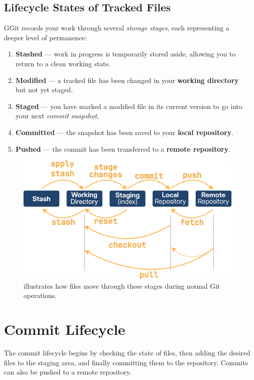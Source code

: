 \subsection{Lifecycle States of Tracked Files}
GGit records your work through several \textit{storage stages}, each representing a deeper level of permanence:
\begin{enumerate}
     \item \textbf{Stashed} --- work in progress is temporarily stored aside, allowing you to return to a clean working state.
    \item \textbf{Modified} --- a tracked file has been changed in your \textbf{working directory} but not yet staged.
    \item \textbf{Staged} --- you have marked a modified file in its current version to go into your next \textit{commit snapshot}.
    \item \textbf{Committed} ---  the snapshot has been saved to your \textbf{local repository}.
    \item \textbf{Pushed} --- the commit has been transferred to a \textbf{remote repository}.
\end{enumerate}

\begin{figure}[H]
\centering
    \includegraphics[scale=1]{Images/recordingChanges.png}
    \caption{illustrates how files move through these stages during normal Git operations.}
\end{figure}
    
\section{Commit Lifecycle}
The commit lifecycle begins by checking the state of files, then adding the desired files to the staging area, and finally committing them to the repository. Commits can also be pushed to a remote repository.

